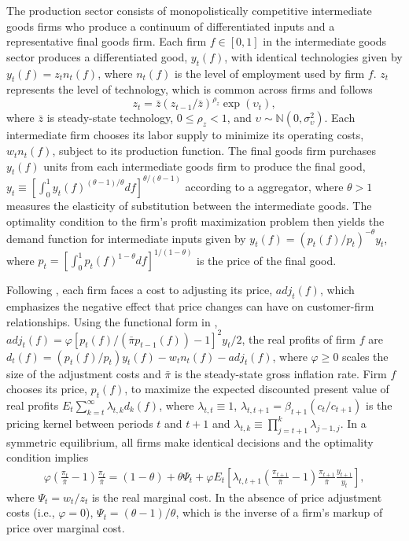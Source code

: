 \documentclass[12pt,final]{article}
\begin{document}
The production sector consists of monopolistically competitive intermediate goods firms who produce a continuum of differentiated inputs and a representative final goods firm. Each firm $f\in[0,1]$ in the intermediate goods sector produces a differentiated good, $y_t(f)$, with identical technologies given by $y_t(f)=z_tn_t(f)$, where $n_t(f)$ is the level of employment used by firm $f$. $z_t$ represents the level of technology, which is common across firms and follows
\begin{equation}
  z_t=\bar{z}(z_{t-1}/\bar{z})^{\rho_z}\exp(\upsilon_t), \label{technology process}
\end{equation}
where $\bar{z}$ is steady-state technology, $0\leq\rho_z<1$, and $\upsilon\sim\mathbb{N}(0,\sigma_\upsilon^2)$. Each intermediate firm chooses its labor supply to minimize its operating costs, $w_tn_t(f)$, subject to its production function. The final goods firm purchases $y_t(f)$ units from each intermediate goods firm to produce the final good, $y_t\equiv[\int_0^1y_t(f)^{(\theta-1)/\theta}df]^{\theta/(\theta-1)}$ according to a \citet{DixitStiglitz1977} aggregator, where $\theta>1$ measures the elasticity of substitution between the intermediate goods. The optimality condition to the firm's profit maximization problem then yields the demand function for intermediate inputs given by $y_t(f)=(p_t(f)/p_t)^{-\theta}y_t$, where $p_t=[\int_0^1p_t(f)^{1-\theta}df]^{1/(1-\theta)}$ is the price of the final good.

Following \citet{Rotemberg1982}, each firm faces a cost to adjusting its price, $adj_t(f)$, which emphasizes the negative effect that price changes can have on customer-firm relationships. Using the functional form in \citet{Ireland1997}, $adj_t(f) = \varphi[p_t(f)/(\bar{\pi} p_{t-1}(f))-1]^2y_t/2$, the real profits of firm $f$ are $d_t(f)=(p_t(f)/p_t)y_t(f)-w_tn_t(f)-adj_t(f)$, where $\varphi\geq0$ scales the size of the adjustment costs and $\bar{\pi}$ is the steady-state gross inflation rate. Firm $f$ chooses its price, $p_t(f)$, to maximize the expected discounted present value of real profits $E_t\sum_{k=t}^{\infty}\lambda_{t,k}d_k(f)$, where $\lambda_{t,t}\equiv1$, $\lambda_{t,t+1}=\beta_{t+1}(c_t/c_{t+1})$ is the pricing kernel between periods $t$ and $t+1$ and $\lambda_{t,k}\equiv\prod_{j=t+1}^{k}\lambda_{j-1,j}$. In a symmetric equilibrium, all firms make identical decisions and the optimality condition implies
\begin{gather}
  \varphi\left(\frac{\pi_t}{\bar{\pi}}-1\right)\frac{\pi_t}{\bar{\pi}} = (1-\theta) + \theta \Psi_t + \varphi E_t\left[\lambda_{t,t+1}\left(\frac{\pi_{t+1}}{\bar{\pi}}-1\right)\frac{\pi_{t+1}}{\bar{\pi}}\frac{y_{t+1}}{y_t}\right], \label{firm pricing}
\end{gather}
where $\Psi_t=w_t/z_t$ is the real marginal cost. In the absence of price adjustment costs (i.e., $\varphi=0$), $\Psi_t=(\theta-1)/\theta $, which is the inverse of a firm's markup of price over marginal cost.
\end{document}
